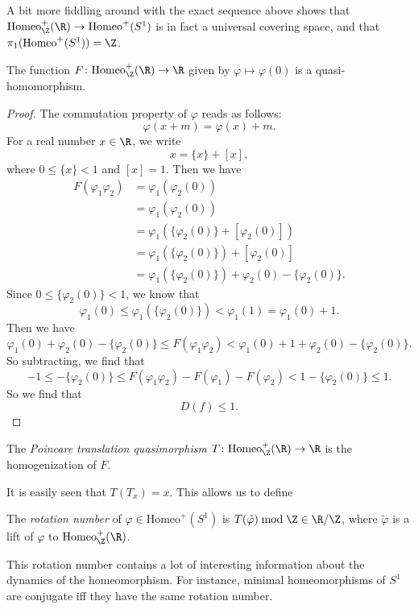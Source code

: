 \documentclass[a4paper]{article}
\newcommand\Homeo{\mathrm{Homeo}}
\begin{document}
A bit more fiddling around with the exact sequence above shows that $\Homeo^+_{\Z}(\R) \to \Homeo^+(S^1)$ is in fact a universal covering space, and that $\pi_1(\Homeo^+(S^1)) = \Z$.

\begin{lemma}
  The function $F\colon \Homeo_\Z^+(\R) \to \R$ given by $\varphi \mapsto \varphi(0)$ is a quasi-homomorphism.
\end{lemma}

\begin{proof}
  The commutation property of $\varphi$ reads as follows:
  \[
    \varphi(x + m) = \varphi(x) + m.
  \]
  For a real number $x \in \R$, we write
  \[
    x = \{x \} + [x],
  \]
  where $0 \leq \{x\} < 1$ and $[x] = 1$. Then we have
  \begin{align*}
    F(\varphi_1 \varphi_2) &= \varphi_1(\varphi_2(0)) \\
    &= \varphi_1(\varphi_2(0))\\
    &= \varphi_1(\{\varphi_2(0)\} + [\varphi_2(0)])\\
    &= \varphi_1(\{\varphi_2(0)\}) + [\varphi_2(0)]\\
    &= \varphi_1(\{\varphi_2(0)\}) + \varphi_2(0) - \{\varphi_2(0)\}.
  \end{align*}
  Since $0 \leq \{\varphi_2(0)\} < 1$, we know that
  \[
    \varphi_1(0) \leq \varphi_1(\{\varphi_2(0)\}) < \varphi_1(1) = \varphi_1(0) + 1.
  \]
  Then we have
  \[
    \varphi_1(0) + \varphi_2(0) - \{\varphi_2(0)\} \leq F(\varphi_1\varphi_2) < \varphi_1(0) + 1 + \varphi_2(0) - \{\varphi_2(0)\}.
  \]
  So subtracting, we find that
  \[
    -1 \leq - \{\varphi_2(0)\} \leq F(\varphi_1 \varphi_2) - F(\varphi_1) - F(\varphi_2) < 1 - \{\varphi_2(0) \} \leq 1.
  \]
  So we find that
  \[
    D(f) \leq 1.
  \]
\end{proof}

\begin{defi}
  The \emph{Poincare translation quasimorphism} $T\colon \Homeo_\Z^+ (\R) \to \R$ is the homogenization of $F$.
\end{defi}

It is easily seen that $T(T_x) = x$. This allows us to define

\begin{defi}
  The \emph{rotation number}  of $\varphi \in \Homeo^+(S^1)$ is $T(\tilde{\varphi}) \bmod \Z \in \R/\Z$, where $\tilde{\varphi}$ is a lift of $\varphi$ to $\Homeo_\Z^+(\R)$.
\end{defi}
This rotation number contains a lot of interesting information about the dynamics of the homeomorphism. For instance, minimal homeomorphisms of $S^1$ are conjugate iff they have the same rotation number.
\end{document}
